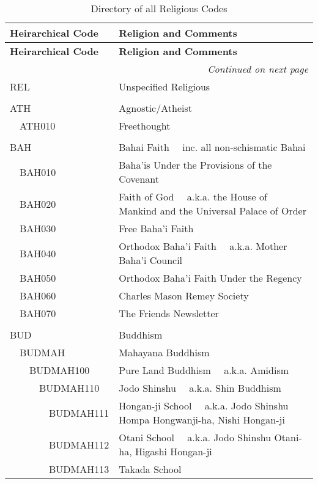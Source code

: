 \documentclass[12pt]{article}
\begin{document}
\begin{tiny}
\begin{center}
\begin{longtable}{|l|l|}
\caption{Directory of all Religious Codes }
\label{tab:CAMEORCScodes}
\\ \cline{1-1} \cline{1-2}
\textbf{{\normalsize Heirarchical Code}} & \textbf{{\normalsize Religion and Comments }} \\
\hline
\endfirsthead
\hline
\textbf{{\normalsize Heirarchical Code }} & \textbf{{\normalsize Religion and Comments }} \\
\hline
\endhead
\hline
\multicolumn{2}{r}{\emph{Continued on next page}}
\endfoot
\hline
\endlastfoot
\\
{\normalsize REL } & {\normalsize  Unspecified Religious } \\
 \\
{\normalsize ATH } & {\normalsize Agnostic/Atheist } \\
~~ATH010 & Freethought \\
 \\
{\normalsize BAH } & {\normalsize Bahai Faith	~~inc. all non-schismatic Bahai } \\
~~BAH010 & Baha'is Under the Provisions of the Covenant \\
~~BAH020 & Faith of God	~~a.k.a. the House of Mankind and the Universal Palace of Order \\
~~BAH030 & Free Baha'i Faith \\
~~BAH040 & Orthodox Baha'i Faith	~~a.k.a. Mother Baha'i Council \\
~~BAH050 & Orthodox Baha'i Faith Under the Regency \\
~~BAH060 & Charles Mason Remey Society \\
~~BAH070 & The Friends Newsletter \\
 \\
{\normalsize BUD } & {\normalsize Buddhism } \\
~~BUDMAH & Mahayana Buddhism \\
~~~~BUDMAH100 & Pure Land Buddhism	~~a.k.a. Amidism \\
~~~~~~BUDMAH110 & Jodo Shinshu	~~a.k.a. Shin Buddhism \\
~~~~~~~~BUDMAH111 & Hongan-ji School	~~a.k.a. Jodo Shinshu Hompa Hongwanji-ha, Nishi Hongan-ji \\
~~~~~~~~BUDMAH112 & Otani School	~~a.k.a. Jodo Shinshu Otani-ha, Higashi Hongan-ji \\
~~~~~~~~BUDMAH113 & Takada School \\

\end{longtable}
\end{center}
\end{tiny}
\end{document}
